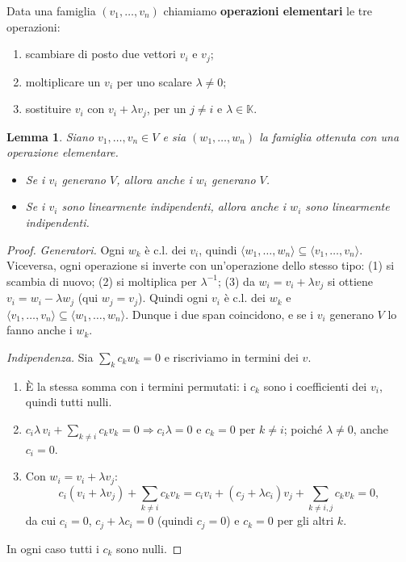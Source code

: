 \documentclass[11pt,a4paper]{article}
\newcommand{\KK}{\mathbb{K}}
\theoremstyle{plain}
\newtheorem{lemma}[prop]{Lemma}
\theoremstyle{definition}
\theoremstyle{remark}
\begin{document}
Data una famiglia $(v_1,\dots,v_n)$ chiamiamo \textbf{operazioni elementari} le tre operazioni:
\begin{enumerate}[label=(\arabic*)]
  \item scambiare di posto due vettori $v_i$ e $v_j$;
  \item moltiplicare un $v_i$ per uno scalare $\lambda\neq0$;
  \item sostituire $v_i$ con $v_i+\lambda v_j$, per un $j\neq i$ e $\lambda\in\KK$.
\end{enumerate}

\begin{lemma}\label{lemma:elementari}
Siano $v_1,\dots,v_n\in V$ e sia $(w_1,\dots,w_n)$ la famiglia ottenuta con una operazione elementare.
\begin{itemize}[leftmargin=*]
  \item Se i $v_i$ generano $V$, allora anche i $w_i$ generano $V$.
  \item Se i $v_i$ sono linearmente indipendenti, allora anche i $w_i$ sono linearmente indipendenti.
\end{itemize}
\end{lemma}

\begin{proof}
\emph{Generatori.} Ogni $w_k$ è c.l. dei $v_i$, quindi $\langle w_1,\dots,w_n\rangle\subseteq\langle v_1,\dots,v_n\rangle$.
Viceversa, ogni operazione si inverte con un'operazione dello stesso tipo:
(1) si scambia di nuovo; (2) si moltiplica per $\lambda^{-1}$; (3) da $w_i=v_i+\lambda v_j$ si ottiene $v_i=w_i-\lambda w_j$ (qui $w_j=v_j$).
Quindi ogni $v_i$ è c.l. dei $w_k$ e $\langle v_1,\dots,v_n\rangle\subseteq\langle w_1,\dots,w_n\rangle$.
Dunque i due span coincidono, e se i $v_i$ generano $V$ lo fanno anche i $w_k$.

\emph{Indipendenza.} Sia $\sum_kc_kw_k=0$ e riscriviamo in termini dei $v$.
\begin{enumerate}[label=(\arabic*)]
  \item È la stessa somma con i termini permutati: i $c_k$ sono i coefficienti dei $v_i$, quindi tutti nulli.
  \item $c_i\lambda\,v_i+\sum_{k\neq i}c_kv_k=0\Rightarrow c_i\lambda=0$ e $c_k=0$ per $k\ne i$; poiché $\lambda\neq0$, anche $c_i=0$.
  \item Con $w_i=v_i+\lambda v_j$:
  \[
    c_i(v_i+\lambda v_j)+\sum_{k\ne i}c_kv_k
    =c_iv_i+(c_j+\lambda c_i)v_j+\sum_{k\neq i,j}c_kv_k=0 ,
  \]
  da cui $c_i=0$, $c_j+\lambda c_i=0$ (quindi $c_j=0$) e $c_k=0$ per gli altri $k$.
\end{enumerate}
In ogni caso tutti i $c_k$ sono nulli.
\end{proof}
\end{document}
